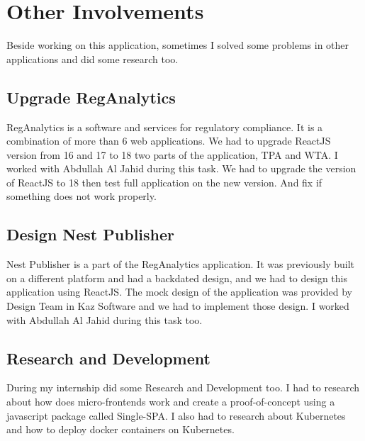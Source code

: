 \section{Other Involvements}

Beside working on this application, sometimes I solved some problems in other applications and did some research too.

\subsection{Upgrade RegAnalytics}

RegAnalytics is a software and services for regulatory compliance.
It is a combination of more than 6 web applications.
We had to upgrade ReactJS version from 16 and 17 to 18 two parts of the application, TPA and WTA.
I worked with Abdullah Al Jahid during this task.
We had to upgrade the version of ReactJS to 18 then test full application on the new version.
And fix if something does not work properly.

\subsection{Design Nest Publisher}

Nest Publisher is a part of the RegAnalytics application.
It was previously built on a different platform and had a backdated design, and we had to design this application using ReactJS.
The mock design of the application was provided by Design Team in Kaz Software and we had to implement those design.
I worked with Abdullah Al Jahid during this task too.

\subsection{Research and Development}

During my internship did some Research and Development too.
I had to research about how does micro-frontends work and create a proof-of-concept using a javascript package called Single-SPA.
I also had to research about Kubernetes and how to deploy docker containers on Kubernetes.